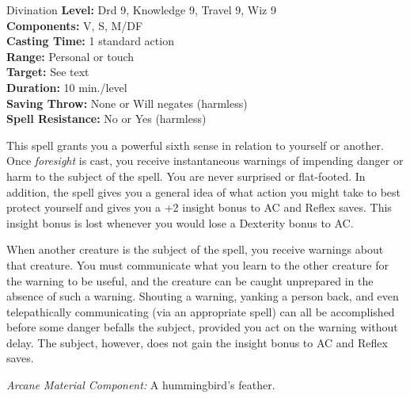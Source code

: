 {Divination}
{
	\textbf{Level:}
	Drd 9, Knowledge 9, Travel 9, Wiz 9\\
	\textbf{Components:}
	V, S, M/DF\\
	\textbf{Casting Time:}
	1 standard action\\
	\textbf{Range:}
	Personal or touch\\
	\textbf{Target:}
	See text\\
	\textbf{Duration:}
	10 min./level\\
	\textbf{Saving Throw:}
	None or Will negates (harmless)\\
	\textbf{Spell Resistance:}
	No or Yes (harmless)\\
}
{
	This spell grants you a powerful sixth sense in relation to yourself or another. Once \emph{foresight} is cast, you receive instantaneous warnings of impending danger or harm to the subject of the spell. You are never surprised or flat-footed. In addition, the spell gives you a general idea of what action you might take to best protect yourself and gives you a +2 insight bonus to AC and Reflex saves. This insight bonus is lost whenever you would lose a Dexterity bonus to AC.

	When another creature is the subject of the spell, you receive warnings about that creature. You must communicate what you learn to the other creature for the warning to be useful, and the creature can be caught unprepared in the absence of such a warning. Shouting a warning, yanking a person back, and even telepathically communicating (via an appropriate spell) can all be accomplished before some danger befalls the subject, provided you act on the warning without delay. The subject, however, does not gain the insight bonus to AC and Reflex saves.

	\textit{Arcane Material Component:}
	A hummingbird's feather.

}
